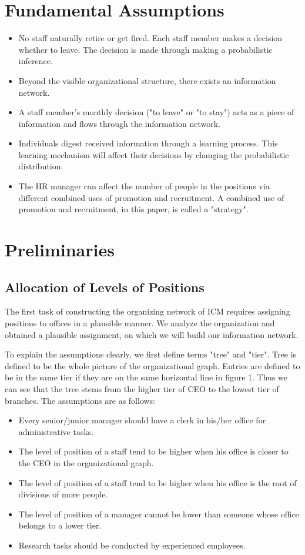 \documentclass[tcn = 37075, sheet = false, abstract = false]{mcmthesis}
\begin{document}
\section{Fundamental Assumptions}

\begin{itemize}
\item No staff naturally retire or get fired. Each staff member makes a decision whether to leave. The decision is made through making a probabilistic inference.
\item Beyond the visible organizational structure, there exists an information network.
\item A staff member's monthly decision ("to leave" or "to stay") acts as a piece of information and flows through the information network.
\item Individuals digest received information through a learning process. This learning mechanism will affect their decisions by changing the probabilistic distribution.
\item The HR manager can affect the number of people in the positions via different combined uses of promotion and recruitment. A combined use of promotion and recruitment, in this paper, is called a "strategy".
\end{itemize}

\section{Preliminaries}

\subsection{Allocation of Levels of Positions}

The first task of constructing the organizing network of ICM requires assigning positions to offices in a plausible manner. We analyze the organization and obtained a plausible assignment, on which we will build our information network.

To explain the assumptions clearly, we first define terms "tree" and "tier". Tree is defined to be the whole picture of the organizational graph. Entries are defined to be in the same tier if they are on the same horizontal line in figure 1. Thus we can see that the tree stems from the higher tier of CEO to the lowest tier of branches. The assumptions are as follows:

\begin{itemize}
\item Every senior/junior manager should have a clerk in his/her office for administrative tasks.
\item The level of position of a staff tend to be higher when his office is closer to the CEO in the organizational graph.
\item The level of position of a staff tend to be higher when his office is the root of divisions of more people.
\item The level of position of a manager cannot be lower than someone whose office belongs to a lower tier.
\item Research tasks should be conducted by experienced employees.
\end{itemize}
\end{document}
